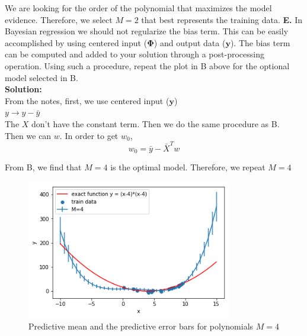 \documentclass{article}
\newcommand{\widefigurewidth}{0.8\textwidth}
\begin{document}
We are looking for the order of the polynomial that maximizes the model evidence. Therefore, we select $M =2$ that best represents the training data. 
\newpage
\textbf{E. } In Bayesian regression we should not regularize the bias term. This can be easily accomplished by using centered input ($\mathbf{\Phi}$) and output data ($\mathbf{y}$). The bias term can be computed and added to your solution through a post-processing operation. Using such a procedure, repeat the plot in B above for the optional model selected in B.\\
\textbf{Solution:}  \\
From the notes, first, we use centered input ($\mathbf{y}$) \\
$y \rightarrow y-\bar{y}$ \\
The $X$ don't have the constant term.
Then we do the same procedure as B.
\\
Then we can $w$.
In order to get $w_{0}$, 
\begin{equation}
    w_{0} = \bar{y} - \bar{X}^{T}w
\end{equation}

From B, we find that $M=4$ is the optimal model.
Therefore, we repeat $M=4$

\begin{figure}[h!]
\centering
\includegraphics[width=\widefigurewidth]{fig/P7e.png}
\caption{Predictive mean and the predictive error bars for polynomials $M = 4$}
\end{figure}


%
%
\end{document}

